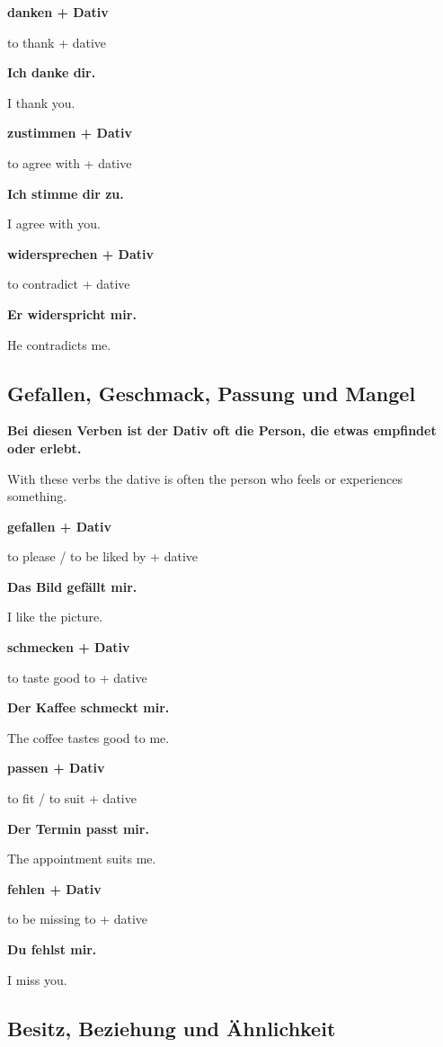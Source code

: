 \documentclass[a4paper]{article}
\newcommand{\EN}[1]{\par{\small\textcolor{TranslationGray}{#1}}\vspace{0.4em}}
\begin{document}
            \textbf{danken + Dativ}
            \EN{to thank + dative}
            
            \textbf{Ich danke dir.}
            \EN{I thank you.}
            
            \textbf{zustimmen + Dativ}
            \EN{to agree with + dative}
            
            \textbf{Ich stimme dir zu.}
            \EN{I agree with you.}
            
            \textbf{widersprechen + Dativ}
            \EN{to contradict + dative}
            
            \textbf{Er widerspricht mir.}
            \EN{He contradicts me.}
        
        \subsection{Gefallen, Geschmack, Passung und Mangel}
            
            \textbf{Bei diesen Verben ist der Dativ oft die Person, die etwas empfindet oder erlebt.}
            \EN{With these verbs the dative is often the person who feels or experiences something.}
            
            \textbf{gefallen + Dativ}
            \EN{to please / to be liked by + dative}
            
            \textbf{Das Bild gefällt mir.}
            \EN{I like the picture.}
            
            \textbf{schmecken + Dativ}
            \EN{to taste good to + dative}
            
            \textbf{Der Kaffee schmeckt mir.}
            \EN{The coffee tastes good to me.}
            
            \textbf{passen + Dativ}
            \EN{to fit / to suit + dative}
            
            \textbf{Der Termin passt mir.}
            \EN{The appointment suits me.}
            
            \textbf{fehlen + Dativ}
            \EN{to be missing to + dative}
            
            \textbf{Du fehlst mir.}
            \EN{I miss you.}
        
        \subsection{Besitz, Beziehung und Ähnlichkeit}
            
\end{document}
